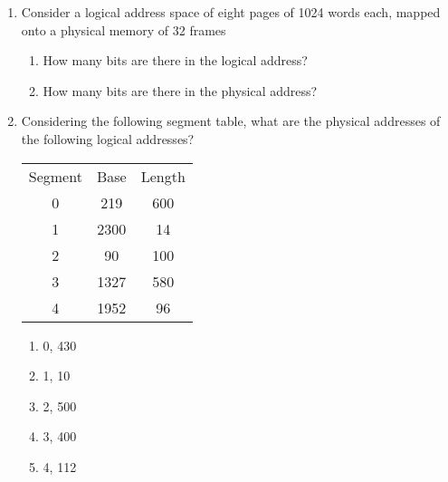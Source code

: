 \documentclass{article}
\begin{document}
\begin{enumerate}
\begin{enumerate}
		\end{enumerate}
		\item Consider a logical address space of eight pages of 1024 words each, mapped onto a physical memory of 32 frames
		\begin{enumerate}
			\item How many bits are there in the logical address?
			\item How many bits are there in the physical address?
		\end{enumerate}
		\item Considering the following segment table, what are the physical addresses of the following logical addresses?
		\begin{table*}[h]
			\centering
			\begin{tabular}{ccc}
				Segment & Base & Length \\
				0       & 219  & 600    \\
				1       & 2300 & 14     \\
				2       & 90   & 100    \\
				3       & 1327 & 580    \\
				4       & 1952 & 96     \\
			\end{tabular}
		\end{table*}
		\begin{multicols}{2}
			\begin{enumerate}
				\item 0, 430
				\item 1, 10
				\item 2, 500
				\item 3, 400
				\item 4, 112
			\end{enumerate}
		\end{multicols}
	\end{enumerate}
\end{document}
